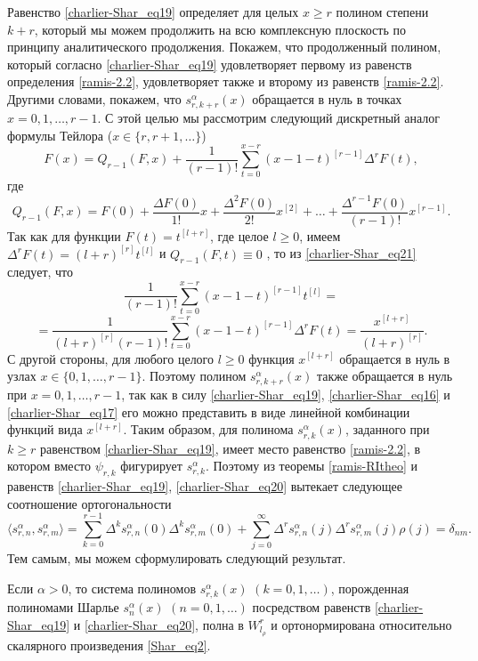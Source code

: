Равенство \eqref{charlier-Shar_eq19} определяет для целых $x\geq r$ полином степени $k+r$, который мы можем продолжить на всю комплексную плоскость по принципу аналитического продолжения. Покажем, что продолженный полином, который согласно \eqref{charlier-Shar_eq19} удовлетворяет первому из равенств определения \eqref{ramis-2.2}, удовлетворяет также и второму из равенств \eqref{ramis-2.2}. Другими словами, покажем, что $s_{r,k+r}^{\alpha}(x)$ обращается в нуль в точках $x=0,1,\ldots,r-1$. С этой целью мы рассмотрим следующий дискретный аналог формулы Тейлора ($x\in\{r,r+1,\ldots\}$)
\begin{equation}\label{charlier-Shar_eq21}
F(x)=Q_{r-1}(F,x) + \frac{1}{(r-1)!}\sum_{t=0}^{x-r} (x-1-t)^{[r-1]}\Delta^rF(t),
\end{equation}
где
\begin{equation}\label{charlier-Shar_eq22}
Q_{r-1}(F,x)= F(0)+\frac{\Delta F(0)}{1!}x+\frac{\Delta^2 F(0)}{2!}
x^{[2]}+\ldots+\frac{\Delta^{r-1} F(0)}{(r-1)!}x^{[r-1]}.
\end{equation}
Так как для функции $F(t)=t^{[l+r]}$, где целое $l\ge0$, имеем $\Delta^r F(t)=(l+r)^{[r]}t^{[l]}$ и $Q_{r-1}(F,t)\equiv0$ , то из \eqref{charlier-Shar_eq21} следует, что
$$ \frac{1}{(r-1)!}\sum_{t=0}^{x-r} (x-1-t)^{[r-1]}t^{[l]}= $$
\begin{equation}\label{charlier-Shar_eq23}
= \frac{1}{(l+r)^{[r]}(r-1)!}\sum_{t=0}^{x-r} (x-1-t)^{[r-1]}\Delta^rF(t)=\frac{x^{[l+r]}}{(l+r)^{[r]}}.
\end{equation}
С другой стороны, для любого целого $l\geq 0$ функция $x^{[l+r]}$ обращается в нуль в узлах $x\in\{0,1,\ldots,r-1\}$. Поэтому полином $s_{r,k+r}^{\alpha}(x)$ также обращается в нуль при $x=0,1,\ldots,r-1$, так как в силу \eqref{charlier-Shar_eq19}, \eqref{charlier-Shar_eq16} и \eqref{charlier-Shar_eq17} его можно представить в виде линейной комбинации функций вида $x^{[l+r]}$. Таким образом, для полинома $s_{r,k}^{\alpha}(x)$, заданного при $k\geq r$ равенством \eqref{charlier-Shar_eq19}, имеет место равенство \eqref{ramis-2.2}, в котором вместо $\psi_{r,k}$ фигурирует $s_{r,k}^\alpha$. Поэтому из теоремы \ref{ramis-RItheo} и равенств \eqref{charlier-Shar_eq19}, \eqref{charlier-Shar_eq20} вытекает следующее соотношение ортогональности
$$ \langle s^\alpha_{r,n},s^\alpha_{r,m} \rangle =\sum_{k=0}^{r-1}\Delta^ks^\alpha_{r,n}(0)\Delta^ks^\alpha_{r,m}(0) + \sum_{j=0}^\infty\Delta^rs^\alpha_{r,n}(j)\Delta^rs^\alpha_{r,m}(j)\rho(j) = \delta_{nm}. $$
Тем самым, мы можем сформулировать следующий результат.
\begin{theorem}\label{charlier-Shar_thm2}
	Если $\alpha>0$, то система полиномов $s_{r,k}^{\alpha}(x)$ $(k=0, 1,\ldots)$, порожденная полиномами Шарлье $s_n^{\alpha}(x)$ $(n=0,1,\ldots)$ посредством равенств \eqref{charlier-Shar_eq19} и \eqref{charlier-Shar_eq20}, полна в $W^r_{l_\rho}$ и ортонормирована относительно скалярного произведения \eqref{Shar_eq2}.
\end{theorem}


